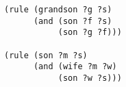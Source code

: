 \documentclass[a4paper,12pt]{article}
\begin{document}
\begin{lstlisting}
(rule (grandson ?g ?s)
      (and (son ?f ?s)
           (son ?g ?f)))

(rule (son ?m ?s)
      (and (wife ?m ?w)
           (son ?w ?s)))
\end{lstlisting}
\end{document}
